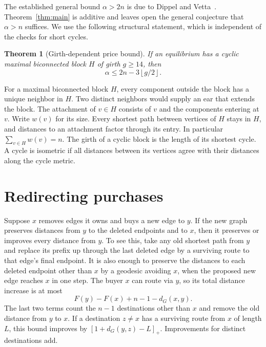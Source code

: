 \documentclass[11pt]{article}
\newtheorem{theorem}{Theorem}
\newcommand{\dG}{d_G}
\newcommand{\pos}[1]{\left[#1\right]_+}
\newcommand{\floor}[1]{\left\lfloor#1\right\rfloor}
\begin{document}
The established general bound \(\alpha>2n\) is due to Dippel and
Vetta~\cite{dippel}. Theorem~\ref{thm:main} is additive and leaves
open the general conjecture that \(\alpha>n\) suffices. We use the
following structural statement, which is independent of the checks
for short cycles.

\begin{theorem}[Girth-dependent price bound]\label{thm:girth}
If an equilibrium has a cyclic maximal biconnected block \(H\) of
girth \(g\ge14\), then
\[
 \alpha\le 2n-3\floor{g/2}.
\]
\end{theorem}

For a maximal biconnected block \(H\), every component outside the
block has a unique neighbor in \(H\). Two distinct neighbors would
supply an ear that extends the block. The attachment of \(v\in H\)
consists of \(v\) and the components entering at \(v\). Write \(w(v)\)
for its size. Every shortest path between vertices of \(H\) stays in
\(H\), and distances to an attachment factor through its entry.
In particular \(\sum_{v\in H}w(v)=n\). The girth of a cyclic block
is the length of its shortest cycle. A cycle is isometric if all
distances between its vertices agree with their distances along
the cycle metric.

\section{Redirecting purchases}\label{sec:redirect}

Suppose \(x\) removes edges it owns and buys a new edge to \(y\).
If the new graph preserves distances from \(y\) to the deleted
endpoints and to \(x\), then it preserves or improves every distance
from \(y\). To see this, take any old shortest path from \(y\) and
replace its prefix up through the last deleted edge by a surviving
route to that edge's final endpoint. It is also enough to preserve
the distances to each deleted endpoint other than \(x\) by a
geodesic avoiding \(x\), when the proposed new edge reaches \(x\)
in one step. The buyer \(x\) can route via \(y\), so its total
distance increase is at most
\[
 F(y)-F(x)+n-1-\dG(x,y).
 \tag{1}\label{eq:swap}
\]
The last two terms count the \(n-1\) destinations other than \(x\)
and remove the old distance from \(y\) to \(x\).
If a destination \(z\ne x\) has a surviving route from \(x\) of
length \(L\), this bound improves by
\(\pos{1+\dG(y,z)-L}\). Improvements for distinct destinations add.
\end{document}
